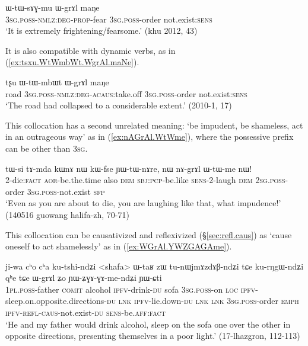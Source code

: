 \begin{exe}
\ex \label{ex:WtWsAGmu.WgrAl.maNe}
\gll  ɯ-tɯ-sɤɣ-mu ɯ-grɤl maŋe \\
\textsc{3sg}.\textsc{poss}-\textsc{nmlz}:\textsc{deg}-\textsc{prop}-fear \textsc{3sg}.\textsc{poss}-order not.exist:\textsc{sens} \\
\glt `It is extremely frightening/fearsome.' (khu 2012, 43)
\end{exe}

It is also compatible with dynamic verbs, as in (\ref{ex:tsxu.WtWmbWt.WgrAl.maNe}).

\begin{exe}
\ex \label{ex:tsxu.WtWmbWt.WgrAl.maNe}
\gll  tʂu ɯ-tɯ-mbɯt ɯ-grɤl maŋe \\
road \textsc{3sg}.\textsc{poss}-\textsc{nmlz}:\textsc{deg}-\textsc{acaus}:take.off  \textsc{3sg}.\textsc{poss}-order not.exist:\textsc{sens}  \\
\glt `The road had collapsed to a considerable extent.' (2010-1, 17)
\end{exe}


This collocation has a second unrelated meaning: `be impudent, be shameless, act in an outrageous way' as in (\ref{ex:nAGrAl.WtWme}), where the possessive prefix can be other than \textsc{3sg}.

\begin{exe}
\ex \label{ex:nAGrAl.WtWme}
\gll tɯ-si tɤ-mda kɯnɤ nɯ kɯ-fse ɲɯ-tɯ-nɤre, nɯ nɤ-grɤl ɯ-tɯ-me nɯ! \\
2-die:\textsc{fact} \textsc{aor}-be.the.time also \textsc{dem} \textsc{sbj}:\textsc{pcp}-be.like \textsc{sens}-2-laugh \textsc{dem} \textsc{2sg}.\textsc{poss}-order \textsc{3sg}.\textsc{poss}-not.exist \textsc{sfp} \\
\glt `Even as you are about to die, you are laughing like that, what impudence!' (140516 guowang halifa-zh, 70-71)
\end{exe}

This collocation can be causativized and reflexivized (§\ref{sec:refl.caus}) as  `cause oneself to act shamelessly' as in (\ref{ex:WGrAl.YWZGAGAme}).

\begin{exe}
\ex \label{ex:WGrAl.YWZGAGAme}
\gll ji-wa cʰo cʰa ku-tshi-ndʑi <shafa> ɯ-taʁ zɯ tu-nɯjmɤzdɤβ-ndʑi tɕe ku-rŋgɯ-ndʑi qʰe tɕe
ɯ-grɤl ʑo ɲɯ-ʑɣɤ-ɣɤ-me-ndʑi ɲɯ-ɕti \\
\textsc{1pl}.\textsc{poss}-father \textsc{comit} alcohol \textsc{ipfv}-drink-\textsc{du} sofa \textsc{3sg}.\textsc{poss}-on \textsc{loc} \textsc{ipfv}-sleep.on.opposite.directions-\textsc{du} \textsc{lnk} \textsc{ipfv}-lie.down-\textsc{du} \textsc{lnk} \textsc{lnk} \textsc{3sg}.\textsc{poss}-order \textsc{emph} \textsc{ipfv}-\textsc{refl}-\textsc{caus}-not.exist-\textsc{du} \textsc{sens}-be.\textsc{aff}:\textsc{fact}   \\
\glt `He and my father would drink alcohol, sleep on the sofa one over the other in opposite directions, presenting themselves in a poor light.' (17-lhazgron, 112-113)
\end{exe}

